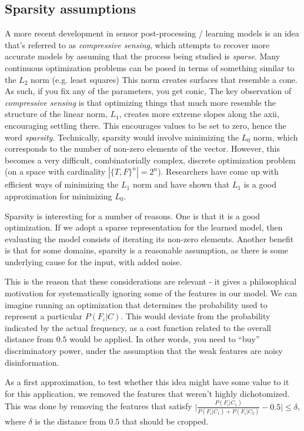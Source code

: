 \documentclass[12pt,a4paper]{article}
\begin{document}
\subsection { Sparsity assumptions }

A more recent development in sensor post-processing / learning models is an idea that's referred to as \emph{compressive sensing}, which attempts to recover more accurate models by assuming that the process being studied is \emph{sparse}.  Many continuous optimization problems can be posed in terms of something similar to the $ L_2 $ norm (e.g. least squares)  This norm creates surfaces that resemble a cone.  As such, if you fix any of the parameters, you get conic,   The key observation of \emph{compressive sensing} is that optimizing things that much more resemble the structure of the linear norm, $ L_1 $, creates more extreme slopes along the axii, encouraging settling there.  This encourages values to be set to zero, hence the word \emph{sparsity}.  Technically, sparsity would involve minimizing the $ L_0 $ norm, which corresponds to the number of non-zero elements of the vector.  However, this becomes a very difficult, combinatorially complex, discrete optimization problem (on a space with cardinality $ | \{T, F\}^n | =  2^n $).  Researchers have come up with efficient ways of minimizing the $ L_1 $ norm and have shown that $ L_1 $ is a good approximation for minimizing $ L_0 $.

Sparsity is interesting for a number of reasons.  One is that it is a good optimization.  If we adopt a sparse representation for the learned model, then evaluating the model consists of iterating its non-zero elements.  Another benefit is that for some domains, sparsity is a reasonable assumption, as there is some underlying cause for the input, with added noise.

This is the reason that these considerations are relevant - it gives a philosophical motivation for systematically ignoring some of the features in our model.  We can imagine running an optimization that determines the probability used to represent a particular $ P(F_i \vert C) $.  This would deviate from the probability indicated by the actual frequency, as a cost function related to the overall distance from $ 0.5 $ would be applied.  In other words, you need to ``buy'' discriminatory power, under the assumption that the weak features are noisy disinformation.

As a first approximation, to test whether this idea might have some value to it for this application, we removed the features that weren't highly dichotomized.  This was done by removing the features that satisfy $ \vert \frac{P(F_i \vert C_1)}{P(F_i \vert C_1) + P(F_i \vert C_2)} - 0.5 \vert \leq \delta $, where $ \delta $ is the distance from $ 0.5 $ that should be cropped.
\end{document}
